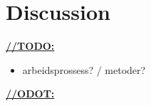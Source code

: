 \chapter{Discussion}

\underline{\textbf{\LARGE //TODO:}}

\begin{itemize}
\item arbeidsprossess? / metoder?
\end{itemize}


\underline{\textbf{\LARGE //ODOT:}}